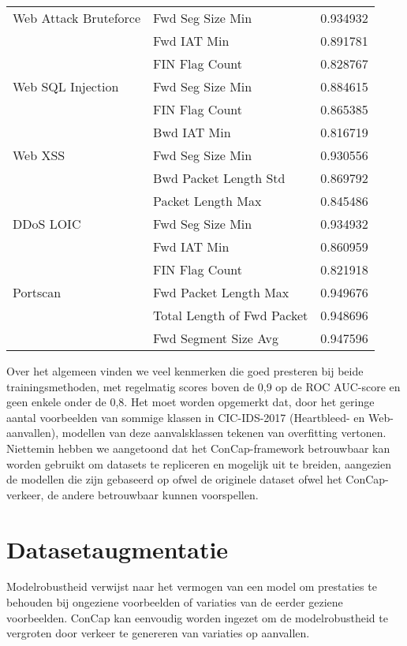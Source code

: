 \documentclass[conference]{IEEEtran}
\begin{document}
\begin{table}
\begin{tabular}{ m{10em}  m{10em} m{8em} }
			\midrule
			Web Attack Bruteforce & Fwd Seg Size Min & 0.934932\\
			{} & Fwd IAT Min & 0.891781\\
			{} & FIN Flag Count & 0.828767\\
			\midrule
			Web SQL Injection & Fwd Seg Size Min & 0.884615\\
			{} & FIN Flag Count & 0.865385\\
			{} & Bwd IAT Min & 0.816719\\
			\midrule
			Web XSS & Fwd Seg Size Min & 0.930556\\
			{} &  Bwd Packet Length Std & 0.869792\\
			{} & Packet Length Max & 0.845486\\
			\midrule
			DDoS LOIC & Fwd Seg Size Min & 0.934932\\
			{} & Fwd IAT Min & 0.860959\\
			{} & FIN Flag Count & 0.821918\\
			\midrule
			Portscan & Fwd Packet Length Max & 0.949676\\
			{} & Total Length of Fwd Packet & 0.948696\\
			{} & Fwd Segment Size Avg & 0.947596\\
			\midrule
		\end{tabular}
		\label{tab:results}
	\end{table}
	
	Over het algemeen vinden we veel kenmerken die goed presteren bij beide trainingsmethoden, met regelmatig scores boven de 0,9 op de ROC AUC-score en geen enkele onder de 0,8. Het moet worden opgemerkt dat, door het geringe aantal voorbeelden van sommige klassen in CIC-IDS-2017 (Heartbleed- en Web-aanvallen), modellen van deze aanvalsklassen tekenen van overfitting vertonen. Niettemin hebben we aangetoond dat het ConCap-framework betrouwbaar kan worden gebruikt om datasets te repliceren en mogelijk uit te breiden, aangezien de modellen die zijn gebaseerd op ofwel de originele dataset ofwel het ConCap-verkeer, de andere betrouwbaar kunnen voorspellen.
	
	\section{Datasetaugmentatie}\label{augmentation}
	Modelrobustheid verwijst naar het vermogen van een model om prestaties te behouden bij ongeziene voorbeelden of variaties van de eerder geziene voorbeelden. ConCap kan eenvoudig worden ingezet om de modelrobustheid te vergroten door verkeer te genereren van variaties op aanvallen.
	
\end{document}
